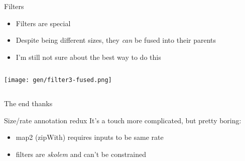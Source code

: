 \documentclass{beamer}
\begin{document}
\begin{frame}[fragile,b]{Filters}
\begin{itemize}
\item Filters are special
\item Despite being different sizes, they \emph{can} be fused into their parents
\item I'm still not sure about the best way to do this
\end{itemize}

\begin{columns}
\column[t]{5cm}

\column[t]{5cm}

\texttt{[image: gen/filter3-fused.png]}

\end{columns}
\end{frame}


\begin{frame}[fragile]{The end}
thanks
\end{frame}


\begin{frame}[fragile]{Size/rate annotation redux}
It's a touch more complicated, but pretty boring:
\begin{itemize}
\item map2 (zipWith) requires inputs to be same rate
\item filters are \emph{skolem} and can't be constrained
\end{itemize}
\end{frame}
\end{document}
